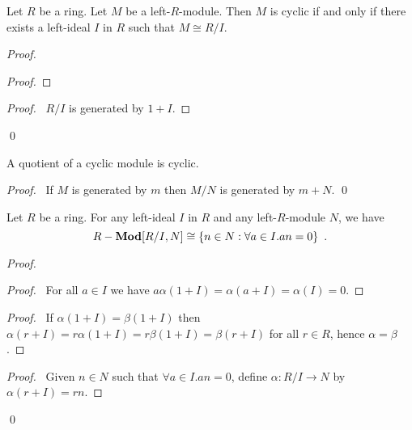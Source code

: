 \begin{prop}
Let $R$ be a ring. Let $M$ be a left-$R$-module. Then $M$ is cyclic if and only if there exists a left-ideal $I$ in $R$ such that $M \cong R / I$.
\end{prop}

\begin{proof}
\pf
{}
\begin{proof}
\end{proof}
\begin{proof}
	\pf\ $R/I$ is generated by $1+I$.
\end{proof}
\qed
\end{proof}

\begin{prop}
A quotient of a cyclic module is cyclic.
\end{prop}

\begin{proof}
\pf\ If $M$ is generated by $m$ then $M/N$ is generated by $m+N$. \qed
\end{proof}

\begin{prop}
Let $R$ be a ring.
For any left-ideal $I$ in $R$ and any left-$R$-module $N$, we have
\[ {R}-\mathbf{Mod}[R/I,N] \cong \{ n \in N : \forall a \in I. an = 0 \} \enspace . \]
\end{prop}

\begin{proof}
\pf
{}
\begin{proof}
	\pf\ For all $a \in I$ we have $a \alpha(1 + I) = \alpha(a +I) = \alpha(I) = 0$.
\end{proof}
\begin{proof}
	\pf\ If $\alpha(1+I) = \beta(1+I)$ then $\alpha(r+I) = r\alpha(1+I) = r\beta(1+I) = \beta(r+I)$ for all $r \in R$, hence $\alpha = \beta$.
\end{proof}
\begin{proof}
	\pf\ Given $n \in N$ such that $\forall a \in I. an = 0$, define $\alpha : R/I \rightarrow N$ by $\alpha(r+I) = rn$.
\end{proof}
\qed
\end{proof}

